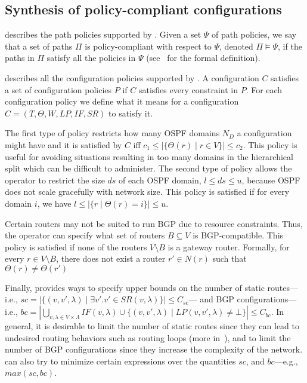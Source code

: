 \subsection{Synthesis of policy-compliant configurations}



 describes the path policies supported by \name.
Given  a set $\Psi$ of
path policies, we say that
a set of paths $\Pi$ is policy-compliant with respect to $\Psi$, denoted 
$\Pi \models \Psi$,
if the paths in $\Pi$ satisfy all the policies in $\Psi$ (see~\cite{genesis} for the formal definition). 


 describes all the configuration policies supported by \name.
A configuration $C$ satisfies a set of configuration policies $P$
if $C$ satisfies every constraint in $P$.
For each configuration policy 
we define what it means for  a configuration $C=(T,\Theta,W,LP,IF,SR)$ to satisfy it.

The first type of policy restricts how many OSPF domains $N_D$ a
configuration might have
and it is satisfied by $C$ iff $c_1\leq |\{\Theta(r)\mid r\in V\}|\leq
c_2$.  This policy is useful for avoiding situations resulting in too
many domains in the hierarchical split which can be difficult to
administer.  The second type of policy allows the operator to restrict
the size $ds$ of each OSPF domain, $l\leq ds\leq u$, because OSPF does
not scale gracefully with network size.  This policy is satisfied if
for every domain $i$, we have $l\leq |\{r \mid \Theta(r)=i\}|\leq u$.


Certain 
	routers may not be suited to run BGP due to resource
	constraints. Thus, the operator can specify what set of 
	routers $B\subseteq V$ is BGP-compatible.  
	This policy is satisfied if none of the routers $V\setminus B$
	is a gateway router.
	Formally, for every $r\in V\setminus B$,
	there does not exist a router $r'\in N(r)$ such that $\Theta(r) \not= \Theta(r')$

Finally, \name provides ways to specify upper bounds on the number of
static routes---i.e., $sc=|\{(v, v', \lambda)\mid \exists v'. v' \in SR(v,\lambda)\}|\leq C_{sc}$--- and
BGP configurations---i.e., 
$bc=|\bigcup_{v,\lambda\in V\times\Lambda} IF(v,\lambda)\cup \{(v,v',\lambda)\mid LP(v,v',\lambda)\neq \bot\}|\leq C_{bc}$.
In general, it is desirable to limit the number of static routes since they
can lead to undesired routing behaviors such as routing loops (more in~), and to limit the number of BGP configurations
since they increase the complexity of the network.
\name can  also try to minimize certain expressions over the quantities $sc$, and $bc$---e.g., $max(sc, bc)$. 

